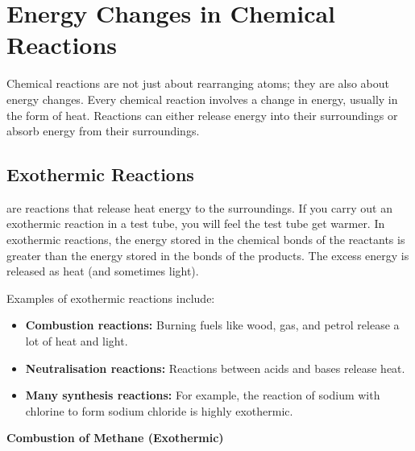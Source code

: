 {\section{Energy Changes in Chemical Reactions}


Chemical reactions are not just about rearranging atoms; they are also about energy changes. Every chemical reaction involves a change in energy, usually in the form of heat. Reactions can either release energy into their surroundings or absorb energy from their surroundings.

\subsection{Exothermic Reactions}


 are reactions that release heat energy to the surroundings.  If you carry out an exothermic reaction in a test tube, you will feel the test tube get warmer.  In exothermic reactions, the energy stored in the chemical bonds of the reactants is greater than the energy stored in the bonds of the products. The excess energy is released as heat (and sometimes light).

Examples of exothermic reactions include:

\begin{itemize}
    \item \textbf{Combustion reactions:} Burning fuels like wood, gas, and petrol release a lot of heat and light.
    \item \textbf{Neutralisation reactions:} Reactions between acids and bases release heat.
    \item \textbf{Many synthesis reactions:} For example, the reaction of sodium with chlorine to form sodium chloride is highly exothermic.
\end{itemize}

\begin{example}
\textbf{Combustion of Methane (Exothermic)}


\end{example}}

